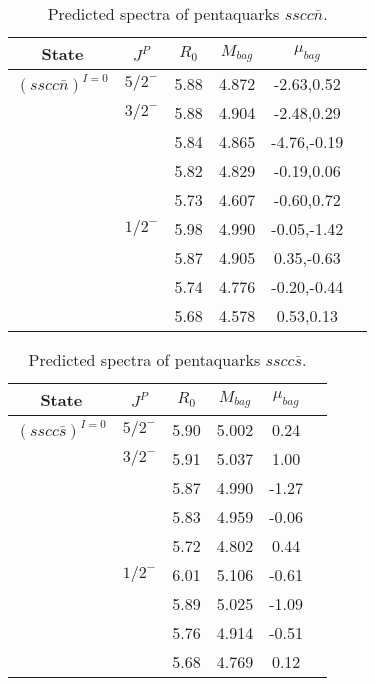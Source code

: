 \documentclass[prd,twocolumn,floatfix,nofootinbib]{revtex4}
\begin{document}
\begin{table*}[!htbp]
    \caption{Predicted spectra of pentaquarks $sscc\bar{n}$.}
    \begin{tabular}{cccccc}
        \hline\hline
        {\rm State} &$J^{P}$ &$R_{0}$ &$M_{bag}$ &$\mu_{bag}$  \\ \hline
        ${(sscc\bar{n})}^{I=0}$
            &${5/2}^{-}$     &5.88   &4.872 &-2.63,0.52  \\                
            &${3/2}^{-}$     &5.88   &4.904 &-2.48,0.29 \\
                         &$ $     &5.84   &4.865 &-4.76,-0.19  \\
                         &$ $     &5.82   &4.829 &-0.19,0.06 \\
                         &$ $     &5.73   &4.607 &-0.60,0.72 \\
            &${1/2}^{-}$     &5.98   &4.990 &-0.05,-1.42  \\
                         &$ $     &5.87   &4.905 &0.35,-0.63  \\
                         &$ $     &5.74   &4.776 &-0.20,-0.44  \\
                         &$ $     &5.68   &4.578 &0.53,0.13 \\
       \hline\hline
    \end{tabular}
\end{table*}

\begin{table*}[!htbp]
    \caption{Predicted spectra of pentaquarks $sscc\bar{s}$.}
    \begin{tabular}{cccccc}
        \hline\hline
        {\rm State} &$J^{P}$ &$R_{0}$ &$M_{bag}$ &$\mu_{bag}$  \\ \hline
        ${(sscc\bar{s})}^{I=0}$
            &${5/2}^{-}$     &5.90   &5.002 &0.24  \\                
            &${3/2}^{-}$     &5.91   &5.037 &1.00 \\
                         &$ $     &5.87   &4.990 &-1.27  \\
                         &$ $     &5.83   &4.959 &-0.06  \\
                         &$ $     &5.72   &4.802 &0.44 \\
            &${1/2}^{-}$     &6.01   &5.106 &-0.61  \\
                         &$ $     &5.89   &5.025 &-1.09  \\
                         &$ $     &5.76   &4.914 &-0.51 \\
                         &$ $     &5.68   &4.769 &0.12 \\
       \hline\hline
    \end{tabular}
\end{table*}           
\end{document}
